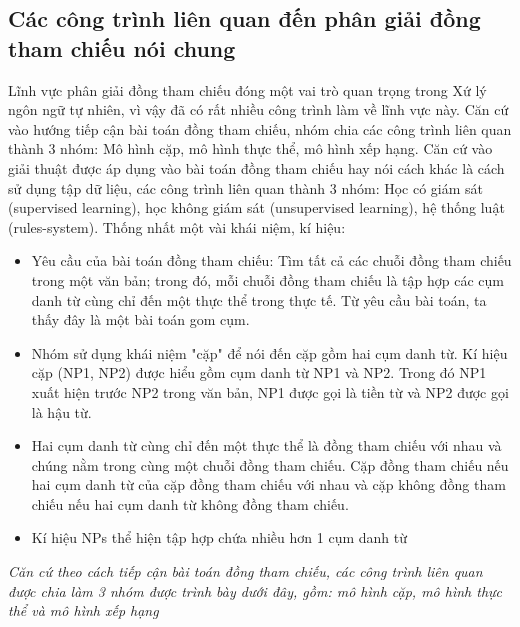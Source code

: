 \documentclass[12pt]{extarticle}
\begin{document}
		\subsection{Các công trình liên quan đến phân giải đồng tham chiếu nói chung}
			\par Lĩnh vực phân giải đồng tham chiếu đóng một vai trò quan trọng trong Xứ lý ngôn ngữ tự nhiên, vì vậy đã có rất nhiều công trình làm về lĩnh vực này. Căn cứ vào hướng tiếp cận bài toán đồng tham chiếu, nhóm chia các công trình liên quan thành 3 nhóm: Mô hình cặp, mô hình thực thể, mô hình xếp hạng. Căn cứ vào giải thuật được áp dụng vào bài toán đồng tham chiếu hay nói cách khác là cách sử dụng tập dữ liệu, các công trình liên quan thành 3 nhóm: Học có giám sát (supervised learning), học không giám sát (unsupervised learning), hệ thống luật (rules-system).
			Thống nhất một vài khái niệm, kí hiệu:
				\begin{itemize}
					\item{Yêu cầu của bài toán đồng tham chiếu: Tìm tất cả các chuỗi đồng tham chiếu trong một văn bản; trong đó, mỗi chuỗi đồng tham chiếu là tập hợp các cụm danh từ cùng chỉ đến một thực thể trong thực tế. Từ yêu cầu bài toán, ta thấy đây là một bài toán gom cụm.} 
					\item{Nhóm sử dụng khái niệm "cặp" để nói đến cặp gồm hai cụm danh từ. Kí hiệu cặp (NP1, NP2) được hiểu gồm cụm danh từ NP1 và NP2. Trong đó NP1 xuất hiện trước NP2 trong văn bản, NP1 được gọi là tiền từ và NP2 được gọi là hậu từ.}
					\item{Hai cụm danh từ cùng chỉ đến một thực thể là đồng tham chiếu với nhau và chúng nằm trong cùng một chuỗi đồng tham chiếu. Cặp đồng tham chiếu nếu hai cụm danh từ của cặp đồng tham chiếu với nhau và cặp không đồng tham chiếu nếu hai cụm danh từ không đồng tham chiếu.}
					\item{Kí hiệu NPs thể hiện tập hợp chứa nhiều hơn 1 cụm danh từ}
				\end{itemize}
			\par \textit{Căn cứ theo cách tiếp cận bài toán đồng tham chiếu, các công trình liên quan được chia làm 3 nhóm được trình bày dưới đây, gồm: mô hình cặp, mô hình thực thể và mô hình xếp hạng}
\end{document}
